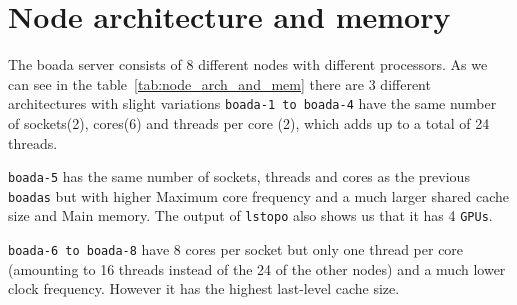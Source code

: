 \pagebreak
\thispagestyle{empty} %
\tableofcontents
\pagebreak
{} 

\section{Node architecture and memory}%
\label{sec:node_architecture_and_memory}


The boada server consists of 8 different nodes with different processors. As we can see in
the table~\ref{tab:node_arch_and_mem} there are 3 different architectures with slight variations
\texttt{boada-1 to boada-4} have the same number of sockets(2), cores(6) and threads per core (2), which adds up to a total of 24 threads.

\texttt{boada-5} has the same number of sockets, threads and cores as the previous \texttt{boadas} but with higher Maximum core frequency and a much larger shared cache size and Main memory.
The output of \texttt{lstopo} also shows us that it has 4 \texttt{GPUs}.

\texttt{boada-6 to boada-8} have 8 cores per socket but only one thread per core (amounting to 16 threads instead of the 24 of the other nodes) and a much lower clock frequency. However it has the
highest last-level cache size.

